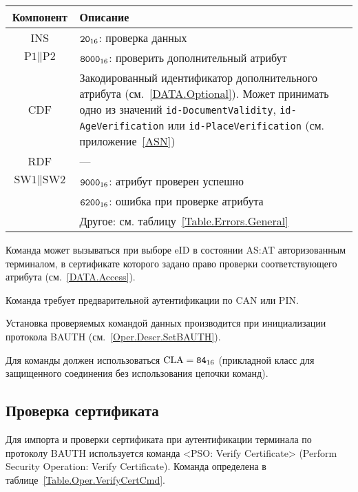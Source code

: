 \begin{table}[hbt]
\caption{}\label{Table.Oper.VerifyDataCmd}
\begin{tabular}{|c|p{14cm}|}
\hline
Компонент & Описание \\
\hline
\hline
INS & $\texttt{20}_{16}$: проверка данных\\
\hline
$\text{P1} \parallel \text{P2}$ & $\texttt{8000}_{16}$: 
проверить дополнительный атрибут\\
\hline
CDF & Закодированный идентификатор дополнительного атрибута 
(см.~\ref{DATA.Optional}). 
Может принимать одно из значений 
\verb|id-DocumentValidity|, \verb|id-AgeVerification| или \verb|id-PlaceVerification| 
(см. приложение~\ref{ASN})\\
\hline 
\hline
RDF &  --- \\
\hline
$\text{SW1} \parallel \text{SW2}$ & $\texttt{9000}_{16}$: атрибут проверен успешно\\
\cline{2-2}
 & $\texttt{6200}_{16}$: ошибка при проверке атрибута\\
\cline{2-2}
 & Другое: см. таблицу~\ref{Table.Errors.General} \\
\hline
\end{tabular}
\end{table}

Команда может вызываться при выборе eID в состоянии AS:AT
авторизованным терминалом, в сертификате которого задано право
проверки соответствующего атрибута (см.~\ref{DATA.Access}).  

Команда требует предварительной аутентификации по CAN или PIN.

Установка проверяемых командой данных производится 
при инициализации протокола BAUTH (см.~\ref{Oper.Descr.SetBAUTH}).  

Для команды должен использоваться $\text{CLA}=\texttt{84}_{16}$ 
(прикладной класс для защищенного соединения без использования цепочки 
команд). 


\subsection{Проверка сертификата}
\label{Oper.Descr.VerifyCert}

Для импорта и проверки сертификата при аутентификации терминала 
по протоколу BAUTH используется команда 
<PSO: Verify Certificate> (Perform Security Operation: Verify Certificate).
%
Команда определена в таблице~\ref{Table.Oper.VerifyCertCmd}.

